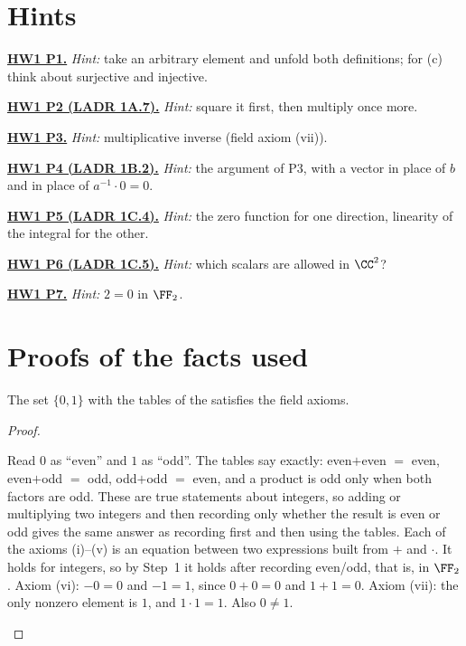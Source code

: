 \documentclass[10pt]{scrartcl}
\begin{document}
\section*{Hints}

\par\medskip\noindent\textbf{\hyperlink{prob-HW1-P1}{HW1 P1.}} \emph{Hint:} take an arbitrary element and unfold both definitions; for (c) think about surjective and injective.

\par\medskip\noindent\textbf{\hyperlink{prob-HW1-P2}{HW1 P2 (LADR 1A.7).}} \emph{Hint:} square it first, then multiply once more.

\par\medskip\noindent\textbf{\hyperlink{prob-HW1-P3}{HW1 P3.}} \emph{Hint:} multiplicative inverse (field axiom (vii)).

\par\medskip\noindent\textbf{\hyperlink{prob-HW1-P4}{HW1 P4 (LADR 1B.2).}} \emph{Hint:} the argument of P3, with a vector in place of $b$ and  in place of $a^{-1}\cdot0=0$.

\par\medskip\noindent\textbf{\hyperlink{prob-HW1-P5}{HW1 P5 (LADR 1C.4).}} \emph{Hint:} the zero function for one direction, linearity of the integral for the other.

\par\medskip\noindent\textbf{\hyperlink{prob-HW1-P6}{HW1 P6 (LADR 1C.5).}} \emph{Hint:} which scalars are allowed in $\CC^2$?

\par\medskip\noindent\textbf{\hyperlink{prob-HW1-P7}{HW1 P7.}} \emph{Hint:} $2=0$ in $\FF_2$.


\section{Proofs of the facts used}

\begin{proposition*}[F1: $\FF_2$ is a field]
  The set $\{0,1\}$ with the tables of the  satisfies the field axioms.
\end{proposition*}
\begin{proof}
  \begin{steps}
    \ii Read $0$ as ``even'' and $1$ as ``odd''. The tables say exactly: even$+$even $=$ even, even$+$odd $=$ odd, odd$+$odd $=$ even, and a product is odd only when both factors are odd. These are true statements about integers, so adding or multiplying two integers and then recording only whether the result is even or odd gives the same answer as recording first and then using the tables.
    \ii Each of the axioms (i)--(v) is an equation between two expressions built from $+$ and $\cdot$. It holds for integers, so by Step~1 it holds after recording even/odd, that is, in $\FF_2$.
    \ii Axiom (vi): $-0=0$ and $-1=1$, since $0+0=0$ and $1+1=0$. Axiom (vii): the only nonzero element is $1$, and $1\cdot1=1$. Also $0\ne1$.
  \end{steps}
\end{proof}
\end{document}
